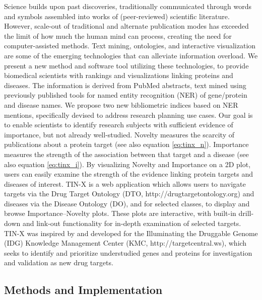 Science builds upon past discoveries, traditionally communicated through words and symbols assembled into works of (peer-reviewed) scientific literature. However, scale-out of traditional and alternate publication modes has exceeded the limit of how much the human mind can process, creating the need for computer-assisted methods\cite{Hunter2006-om}. Text mining, ontologies, and interactive visualization are some of the emerging technologies that can alleviate information overload. We present a new method and software tool utilizing these technologies, to provide biomedical scientists with rankings and visualizations linking proteins and diseases.  The information is derived from PubMed abstracts, text mined using previously published tools for named entity recognition (NER) of gene/protein and disease names\cite{Pletscher-Frankild2015-oo,Szklarczyk2015-bl}. We propose two new bibliometric indices based on NER mentions, specifically devised to address research planning use cases. Our goal is to enable scientists to identify research subjects with sufficient evidence of importance, but not already well-studied. Novelty measures the scarcity of publications about a protein target (see also equation \ref{eq:tinx_n}). Importance measures the strength of the association between that target and a disease (see also equation \ref{eq:tinx_i}). By visualizing Novelty and Importance on a 2D plot, users can easily examine the strength of the evidence linking protein targets and diseases of interest. TIN-X is a web application which allows users to navigate targets via the Drug Target Ontology (DTO, http://drugtargetontology.org) and diseases via the Disease Ontology (DO)\cite{Kibbe2015-li}, and for selected classes, to display and browse Importance–Novelty plots. These plots are interactive, with built-in drill-down and link-out functionality for in-depth examination of selected targets. TIN-X was inspired by and developed for the Illuminating the Druggable Genome (IDG) Knowledge Management Center (KMC, http://targetcentral.ws), which seeks to identify and prioritize understudied genes and proteins for investigation and validation as new drug targets.

\subsection{Methods and Implementation}

